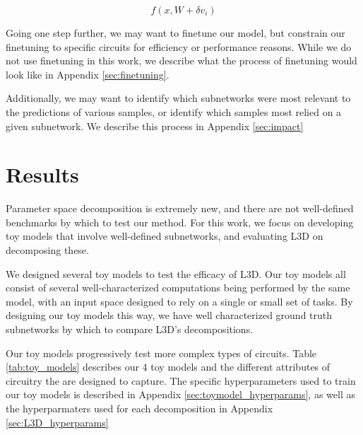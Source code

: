 \documentclass{article}
\theoremstyle{plain}
\theoremstyle{definition}
\theoremstyle{remark}
\begin{document}
\begin{equation}
    f(x, W + \delta v_i)
\end{equation}

Going one step further, we may want to finetune our model, but constrain our finetuning to specific circuits for efficiency or performance reasons. While we do not use finetuning in this work, we describe what the process of finetuning would look like in Appendix \ref{sec:finetuning}.

Additionally, we may want to identify which subnetworks were most relevant to the predictions of various samples, or identify which samples most relied on a given subnetwork. We describe this process in Appendix \ref{sec:impact}

\section{Results}


Parameter space decomposition is extremely new, and there are not well-defined benchmarks by which to test our method. For this work, we focus on developing toy models that involve well-defined subnetworks, and evaluating L3D on decomposing these.

We designed several toy models to test the efficacy of L3D. Our toy models all consist of several well-characterized computations being performed by the same model, with an input space designed to rely on a single or small set of tasks. By designing our toy models this way, we have well characterized ground truth subnetworks by which to compare L3D's decompositions.

Our toy models progressively test more complex types of circuits. Table \ref{tab:toy_models} describes our 4 toy models and the different attributes of circuitry the are designed to capture. The specific hyperparameters used to train our toy models is described in Appendix \ref{sec:toymodel_hyperparams}, as well as the hyperparmaters used for each decomposition in Appendix \ref{sec:L3D_hyperparams}
\end{document}
